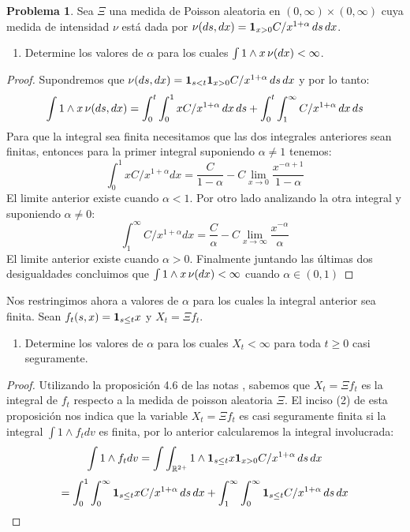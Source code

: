 \documentclass[a5paper,oneside]{amsart}
\theoremstyle{plain}
\theoremstyle{definition}
\newtheorem{problema}{Problema}
\begin{document}
\begin{problema}
 Sea $\Xi$ una medida de Poisson aleatoria en $(0,\infty)\times (0,\infty)$ cuya medida de intensidad $\nu$ est\'a dada por $\nu\!\left( ds,dx\right) ={\bf{1}}_{x>0}C/x^{1+\alpha}\, ds\,dx$. 
\begin{enumerate}
\item Determine los valores de $\alpha$ para los cuales $\int 1\wedge x\,\nu\!\left( dx\right) <\infty$. 
 \end{enumerate}
 \begin{proof}
 Supondremos que $\nu\!\left( ds,dx\right) ={\bf{1}}_{s<t}{\bf{1}}_{x>0}C/x^{1+\alpha}\, ds\, dx$  y por lo tanto:
 $$
 \int 1\wedge x\,\nu\!\left( ds,dx\right) =\int_0^t\int_0^1 x C/x^{1+\alpha} \, dx \, ds + \int_0^t\int_1^\infty  C/x^{1+\alpha} \, dx \, ds
 $$
 Para que la integral sea finita necesitamos que las dos integrales anteriores sean finitas, entonces para la primer integral suponiendo $\alpha \neq  1$ tenemos:
 $$
 \int_0^1 x C/x^{1+\alpha} dx =\frac{C}{1-\alpha} - C\lim_{x \rightarrow 0}\frac{x^{-\alpha+1}}{1-\alpha}
 $$
 El limite anterior existe cuando $\alpha < 1$. Por otro lado analizando la otra  integral y suponiendo $\alpha \neq 0$: 
 $$
  \int_1^\infty  C/x^{1+\alpha} dx=\frac{C}{\alpha}-C\lim_{x \rightarrow \infty}\frac{x^{-\alpha}}{\alpha}
 $$
 El limite anterior existe cuando $\alpha > 0$. Finalmente juntando las \'ultimas dos desigualdades concluimos que  $\int 1\wedge x\,\nu\!\left( dx\right)  < \infty$ cuando $\alpha \in (0,1)$
 \end{proof}
Nos restringimos ahora a valores de $\alpha$ para los cuales la integral anterior sea finita. Sean $f_t\!\left( s,x\right) ={\bf{1}}_{s\leq t}x$ y $X_t=\Xi f_t$. 
 \begin{enumerate}
 \item Determine los valores  de $\alpha$ para los cuales $X_t<\infty$ para toda $t\geq 0$ casi seguramente.
 \end{enumerate}
 \begin{proof}
 Utilizando la proposici\'on 4.6 de las notas , sabemos que  $X_t=\Xi f_t$ es la integral de $f_t$ respecto a la medida de poisson aleatoria $\Xi$. El inciso (2) de esta proposici\'on nos indica que la variable  $X_t=\Xi f_t$ es casi seguramente finita si  la integral $\int 1 \wedge f_t dv$ es finita, por lo anterior calcularemos la integral involucrada:
$$
 \int 1 \wedge f_t dv  = \int \int _{\mathbb{R}^{2+}}  1 \wedge   {\ensuremath{\bf{1}}}_{s\leq t}x {\bf{1}}_{x>0}C/x^{1+\alpha}\, ds\,dx
$$
 $$
 =\int_0^1\int_0^{\infty}{\bf{1}}_{s\leq t}xC/x^{1+\alpha}\, ds\,dx+ \int_1^\infty\int_0^{\infty}{\bf{1}}_{s\leq t}C/x^{1+\alpha}\, ds\,dx
$$
\end{proof}
\end{problema}
\end{document}
